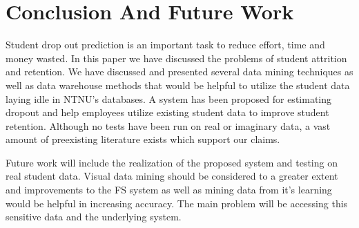 \chapter{Conclusion And Future Work}
Student drop out prediction is an important task to reduce effort, time and money wasted.
In this paper we have discussed the problems of student attrition and retention.
We have discussed and presented several data mining techniques as well as data warehouse methods that would be helpful to utilize the student data laying idle in NTNU's databases.
A system has been proposed for estimating dropout and help employees utilize existing student data to improve student retention.
Although no tests have been run on real or imaginary data, a vast amount of preexisting literature exists which support our claims.

\bigskip\noindent
Future work will include the realization of the proposed system and testing on real student data.
Visual data mining should be considered to a greater extent and improvements to the FS system as well as mining data from it's learning would be helpful in increasing accuracy.
The main problem will be accessing this sensitive data and the underlying system.